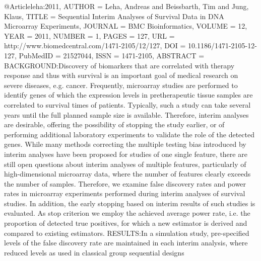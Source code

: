 @Article{leha:2011,
  AUTHOR =	 {Leha, Andreas and Beissbarth, Tim and Jung, Klaus},
  TITLE =	 {Sequential Interim Analyses of Survival Data in DNA
                  Microarray Experiments},
  JOURNAL =	 {BMC Bioinformatics},
  VOLUME =	 {12},
  YEAR =	 {2011},
  NUMBER =	 {1},
  PAGES =	 {127},
  URL =		 {http://www.biomedcentral.com/1471-2105/12/127},
  DOI =		 {10.1186/1471-2105-12-127},
  PubMedID =	 {21527044},
  ISSN =	 {1471-2105},
  ABSTRACT =	 {BACKGROUND:Discovery of biomarkers that are
                  correlated with therapy response and thus with
                  survival is an important goal of medical research on
                  severe diseases, e.g. cancer. Frequently, microarray
                  studies are performed to identify genes of which the
                  expression levels in pretherapeutic tissue samples
                  are correlated to survival times of
                  patients. Typically, such a study can take several
                  years until the full planned sample size is
                  available. Therefore, interim analyses are
                  desirable, offering the possibility of stopping the
                  study earlier, or of performing additional
                  laboratory experiments to validate the role of the
                  detected genes. While many methods correcting the
                  multiple testing bias introduced by interim analyses
                  have been proposed for studies of one single
                  feature, there are still open questions about
                  interim analyses of multiple features, particularly
                  of high-dimensional microarray data, where the
                  number of features clearly exceeds the number of
                  samples. Therefore, we examine false discovery rates
                  and power rates in microarray experiments performed
                  during interim analyses of survival studies. In
                  addition, the early stopping based on interim
                  results of such studies is evaluated. As stop
                  criterion we employ the achieved average power rate,
                  i.e. the proportion of detected true positives, for
                  which a new estimator is derived and compared to
                  existing estimators.
                  RESULTS:In a simulation study,
                  pre-specified levels of the false discovery rate are
                  maintained in each interim analysis, where reduced
                  levels as used in classical group sequential designs
}}

